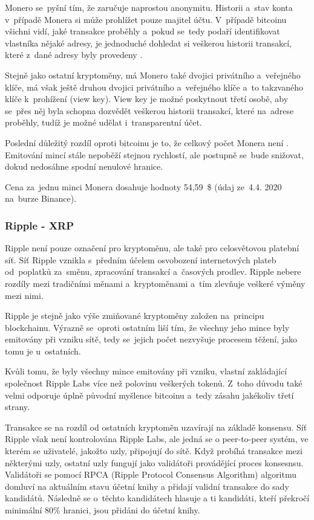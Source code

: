 \documentclass[thesis=B,czech]{FITthesis}[2019/03/21]
\begin{document}
Monero se~pyšní tím, že zaručuje naprostou anonymitu. Historii a~stav konta v~případě Monera si může prohlížet pouze majitel účtu. V~případě bitcoinu všichni vidí, jaké transakce proběhly a~pokud se~tedy podaří identifikovat vlastníka nějaké adresy, je jednoduché dohledat si veškerou historii transakcí, které z~dané adresy byly provedeny .

Stejně jako ostatní kryptoměny, má Monero také dvojici privátního \linebreak a~veřejného klíče, má však ještě druhou dvojici privátního a~veřejného klíče a~to takzvaného klíče k~prohížení (view key). View key je možné poskytnout třetí osobě, aby se~přes něj byla schopna dozvědět veškerou historii transakcí, které na~adrese proběhly, tudíž je možné udělat i~transparentní účet.

Poslední důležitý rozdíl oproti bitcoinu je to, že celkový počet Monera není . Emitování mincí stále nepoběží stejnou rychlostí, ale postupně se~bude snižovat, dokud nedosáhne spodní nenulové hranice. \cite{alza_monero}

Cena za~jednu minci Monera dosahuje hodnoty 54,59~\$ (údaj ze~4.4. 2020 na~burze Binance). \cite{binance_markets}

\subsubsection{Ripple - XRP}
Ripple není pouze označení pro kryptoměnu, ale také pro celosvětovou platební síť. Síť Ripple vznikla s~předním účelem osvobození internetových plateb od~poplatků za~směnu, zpracování transakcí a~časových prodlev. Ripple nebere rozdíly mezi tradičními měnami a~kryptoměnami a~tím zlevňuje veškeré výměny mezi nimi.

Ripple je stejně jako výše zmiňované kryptoměny založen na~principu blockchainu. Výrazně se~oproti ostatním liší tím, že všechny jeho mince byly emitovány při vzniku sítě, tedy se~jejich počet nezvyšuje procesem těžení, jako tomu je u~ostatních.

Kvůli tomu, že byly všechny mince emitovány při vzniku, vlastní zakládající společnost Ripple Labs více než polovinu veškerých tokenů. Z~toho důvodu také velmi odporuje úplně původní myšlence bitcoinu a~tedy zásahu jakékoliv třetí strany. \cite{alza_ripple}

Transakce se na rozdíl od ostatních kryptoměn uzavírají na základě konsensu. Síť Ripple však není kontrolována Ripple Labs, ale jedná se o peer-to-peer systém, ve kterém se uživatelé, jakožto uzly, připojují do sítě. Když probíhá transakce mezi některými uzly, ostatní uzly fungují jako validátoři provádějící proces konsesnsu. Validátoři se pomocí RPCA (Ripple Protocol Consensus Algorithm) algoritmu domluví na aktuálním stavu účetní knihy a přidají validní transakce do sady kandidátů. Následně se o~těchto kandidátech hlasuje a ti kandidáti, kteří překročí minimální 80\% hranici, jsou přidáni do účetní knihy. \cite{RPCA}
\end{document}

